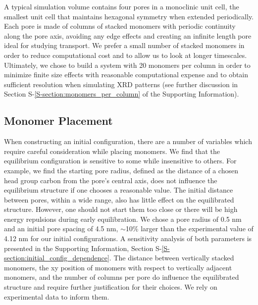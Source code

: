 \documentclass[journal=jpcbfk,manuscript=article]{achemso}
\begin{document}
  
  A typical simulation volume contains four pores in a monoclinic unit cell,
  the smallest unit cell that maintains hexagonal symmetry when extended
  periodically. Each pore is made of columns of stacked monomers with periodic
  continuity along the pore axis, avoiding any edge effects and creating an
  infinite length pore ideal for studying transport. We prefer a small number of stacked
  monomers in order to reduce computational cost and to allow us to look at
  longer timescales. Ultimately, we chose to build a system with 20 monomers
  per column in order to minimize finite size effects with reasonable computational expense 
  and to obtain sufficient resolution when simulating XRD patterns (see further discussion
  in Section S-\ref{S-section:monomers_per_column} of the Supporting Information).
 
  \subsection{Monomer Placement} 

  When constructing an initial configuration, there are a number of variables
  which require careful consideration while placing monomers. We find that the equilibrium
  configuration is sensitive to some while insensitive to others. For example, we find the starting
  pore radius, defined as the distance of a chosen head group carbon from the
  pore's central axis, does not influence the equilibrium structure if one chooses
  a reasonable value. The initial distance between pores, within a wide range, also has 
  little effect on the equilibrated structure. However, one should not start them
  too close or there will be high energy repulsions during early equilibration. We chose a pore radius of 0.5 nm and an initial pore spacing of 4.5 nm, $\sim$10\% larger than the experimental value
  of 4.12 nm for our initial configurations. A sensitivity analysis of both parameters is presented in the 
  Supporting Information, Section S-\ref{S-section:initial_config_dependence}. The 
  distance between vertically stacked monomers, the xy position of monomers with respect 
  to vertically adjacent monomers, and the number of columns per pore do influence the 
  equilibrated structure and require further justification for their choices. We rely on 
  experimental data to inform them. 
\end{document}
